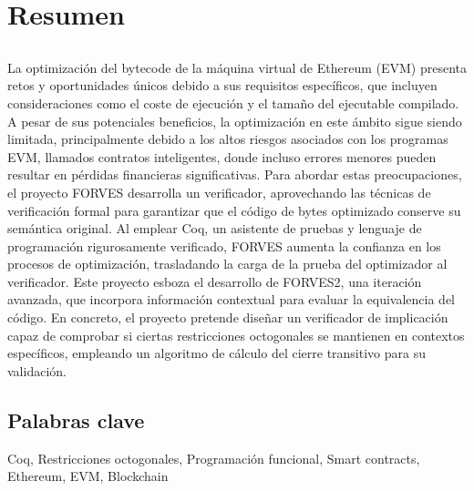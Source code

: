 \chapter*{Resumen}

\section*{\tituloPortadaVal}


La optimización del bytecode de la máquina virtual de Ethereum (EVM) presenta retos y oportunidades únicos debido a 
sus requisitos específicos, que incluyen consideraciones como el coste de ejecución y el tamaño del ejecutable compilado. A 
pesar de sus potenciales beneficios, la optimización en este ámbito sigue siendo limitada, principalmente debido a los 
altos riesgos asociados con los programas EVM, llamados contratos inteligentes, donde incluso errores menores pueden 
resultar en pérdidas financieras significativas. Para abordar estas preocupaciones, el proyecto FORVES desarrolla un 
verificador, aprovechando las técnicas de verificación formal para garantizar que el código de bytes optimizado conserve su 
semántica original. Al emplear Coq, un asistente de pruebas y lenguaje de programación rigurosamente verificado, FORVES 
aumenta la confianza en los procesos de optimización, trasladando la carga de la prueba del optimizador al verificador. 
Este proyecto esboza el desarrollo de FORVES2, una iteración avanzada, que incorpora información contextual para evaluar la 
equivalencia del código. En concreto, el proyecto pretende diseñar un verificador de implicación capaz de comprobar si 
ciertas restricciones octogonales se mantienen en contextos específicos, empleando un algoritmo de cálculo del cierre 
transitivo para su validación.

\section*{Palabras clave}

\noindent Coq, Restricciones octogonales, Programación funcional, Smart contracts, Ethereum, EVM, Blockchain
